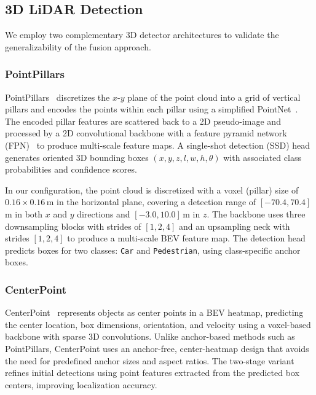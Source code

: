 \documentclass[sustainability,article,submit,moreauthors,pdftex]{Definitions/mdpi}
\begin{document}
\subsection{3D LiDAR Detection}\label{sec:3d_detectors}

We employ two complementary 3D detector architectures to validate the generalizability of the fusion approach.

\subsubsection{PointPillars}\label{sec:pointpillars}

PointPillars~\cite{lang2019pointpillars} discretizes the $x$-$y$ plane of the point cloud into a grid of vertical pillars and encodes the points within each pillar using a simplified PointNet~\cite{qi2017pointnet}. The encoded pillar features are scattered back to a 2D pseudo-image and processed by a 2D convolutional backbone with a feature pyramid network (FPN)~\cite{lin2017fpn} to produce multi-scale feature maps. A single-shot detection (SSD) head generates oriented 3D bounding boxes $(x, y, z, l, w, h, \theta)$ with associated class probabilities and confidence scores.

In our configuration, the point cloud is discretized with a voxel (pillar) size of $0.16 \times 0.16$\,m in the horizontal plane, covering a detection range of $[-70.4, 70.4]$\,m in both $x$ and $y$ directions and $[-3.0, 10.0]$\,m in $z$. The backbone uses three downsampling blocks with strides of $[1, 2, 4]$ and an upsampling neck with strides $[1, 2, 4]$ to produce a multi-scale BEV feature map. The detection head predicts boxes for two classes: \texttt{Car} and \texttt{Pedestrian}, using class-specific anchor boxes.

\subsubsection{CenterPoint}\label{sec:centerpoint}

CenterPoint~\cite{yin2021centerpoint} represents objects as center points in a BEV heatmap, predicting the center location, box dimensions, orientation, and velocity using a voxel-based backbone with sparse 3D convolutions. Unlike anchor-based methods such as PointPillars, CenterPoint uses an anchor-free, center-heatmap design that avoids the need for predefined anchor sizes and aspect ratios. The two-stage variant refines initial detections using point features extracted from the predicted box centers, improving localization accuracy.
\end{document}
